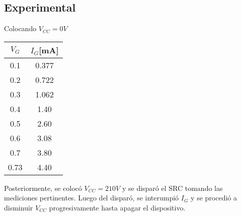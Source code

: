 \subsection{Experimental} %
Colocando $V_{CC}=0V$ 
\par 
\begin{minipage}{0.3\linewidth}
  \centering
  \begin{table}[H]
    \begin{center}
      \begin{tabular}{c|c}
        $V_{G}$ &$I_{G}$[mA]   \\
        \hline
        0.1   &0.377 \\
        0.2   &0.722 \\
        0.3   &1.062 \\
        0.4   &1.40  \\
        0.5   &2.60  \\
        0.6   &3.08  \\
        0.7   &3.80  \\
        0.73  &4.40  \\
      \end{tabular}
    \end{center} 
  \end{table}
\end{minipage}
\begin{minipage}{0.7\linewidth}
  \centering
\end{minipage}
Posteriormente, se colocó $V_{CC}=210V$ y se disparó el SRC tomando las mediciones pertinentes. 
Luego del disparó, se interumpió $I_G$ y se procedió a disminuir $V_{CC}$ progresivamente hasta apagar el dispositivo.
\par
